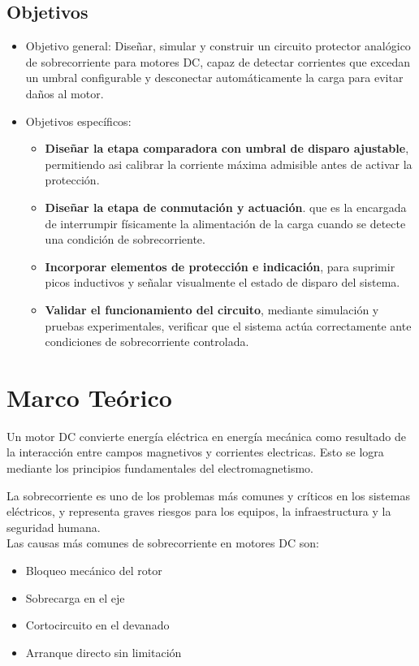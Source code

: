 \documentclass[conference]{IEEEtran}
\begin{document}
\subsection{Objetivos}
\begin{itemize}
    \item Objetivo general: Diseñar, simular y construir un circuito protector analógico de sobrecorriente para motores DC, capaz de detectar corrientes que excedan un umbral configurable y desconectar automáticamente la carga para evitar daños al motor.\\
    \item Objetivos específicos:
    \begin{itemize}
        \item \textbf{Diseñar la etapa comparadora con umbral de disparo ajustable}, permitiendo asi calibrar la corriente máxima admisible antes de activar la protección.
        \item \textbf{Diseñar la etapa de conmutación y actuación}. que es la encargada de interrumpir físicamente la alimentación de la carga cuando se detecte una condición de sobrecorriente.
        \item \textbf{Incorporar elementos de protección e indicación}, para suprimir picos inductivos y señalar visualmente el estado de disparo del sistema.
        \item \textbf{Validar el funcionamiento del circuito}, mediante simulación y pruebas experimentales, verificar que el sistema actúa correctamente ante condiciones de sobrecorriente controlada.
    \end{itemize}
\end{itemize}

\section{Marco Teórico}

Un motor DC convierte energía eléctrica en energía mecánica como resultado de la interacción entre campos magnetivos y corrientes electricas. Esto se logra mediante los principios fundamentales del electromagnetismo.

La sobrecorriente es uno de los problemas más comunes y críticos en los sistemas eléctricos, y representa graves riesgos para los equipos, la infraestructura y la seguridad humana.\\

Las causas más comunes de sobrecorriente en motores DC son: 

\begin{itemize}
	\item Bloqueo mecánico del rotor
	\item Sobrecarga en el eje
	\item Cortocircuito en el devanado
	\item Arranque directo sin limitación\\
\end{itemize}
\end{document}
